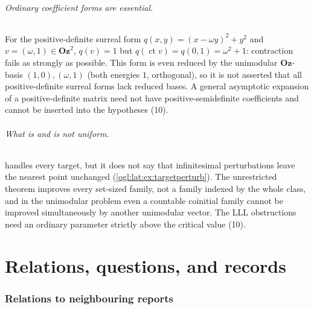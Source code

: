 \documentclass[11pt,oneside]{article}
\numberwithin{equation}{section}
\theoremstyle{definition}
\theoremstyle{remark}
\newcommand{\Oz}{\mathbf{Oz}}
\newcommand{\ct}{\operatorname{ct}}
\begin{document}
\paragraph{Ordinary coefficient forms are essential.} For the positive-definite
surreal form $q(x,y)=(x-\omega y)^2+y^2$ and $v=(\omega,1)\in\Oz^2$, $q(v)=1$ but
$q(\ct v)=q(0,1)=\omega^2+1$: contraction fails as strongly as possible. This form
is even reduced by the unimodular $\Oz$-basis $(1,0),(\omega,1)$ (both energies
$1$, orthogonal), so it is not asserted that all positive-definite surreal forms
lack reduced bases. A general asymptotic expansion of a positive-definite matrix
need not have positive-semidefinite coefficients and cannot be inserted into the
hypotheses (10).

\paragraph{What is and is not uniform.}  handles
every target, but it does not say that infinitesimal perturbations leave the
nearest point unchanged (\cref{ogl:lat:ex:targetperturb}). The unrestricted
theorem improves every set-sized family, not a family indexed by the whole class,
and in the unimodular problem even a countable coinitial family cannot be
improved simultaneously by another unimodular vector. The LLL obstructions need
an ordinary parameter strictly above the critical value (10).
\part*{Relations, questions, and records}

\section{Relations to neighbouring reports}\label{ogl:sec:neighbours}
\end{document}
